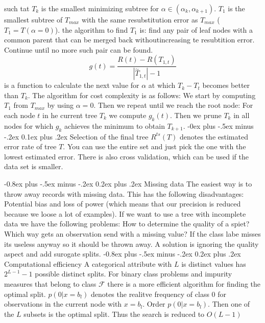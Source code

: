 \documentclass[9pt,landscape]{extarticle}
\makeatletter
\renewcommand{\subsection}{\@startsection{subsection}{2}{0mm}%
                                {-0.8ex plus -.5ex minus -.2ex}%
                                {0.2ex plus .2ex}%
                                {\normalfont\normalsize\bfseries}}
\renewcommand{\subsubsection}{\@startsection{subsubsection}{3}{0mm}%
                                {-0ex plus -.5ex minus -.2ex}%
                                {0.1ex plus .2ex}%
                                {\normalfont\small\bfseries}}
\makeatother
\begin{document}
\begin{multicols}{3}
such tat $T_k$ is the smallest minimizing subtree for
$\alpha \in (\alpha_k, \alpha_{k+1})$. $T_1$ is the smallest subtree of $T_{max}$
with the same resubstitution error as $T_{max}$ ($T_1=T(\alpha=0)$).
the algorithm to find $T_1$ is: find any pair of leaf nodes with a common parent
that can be merged back withoutincreasing te resubtition error. Continue until
no more such pair can be found.
\[g(t)=\frac{R(t)-R(T_{1,t})}{|\overset{\sim}{T}_{1,t}|-1}\]
is a function to calculate the next value for $\alpha$ at which $T_k - T_t$
becomes better than $T_k$.
The algorithm for cost complexity is as follows: We start by computing $T_1$ from $T_{max}$
by using $\alpha = 0$. Then we repeat until we reach the root node:
For each node $t$ in he current tree $T_k$ we compute $g_k(t)$. Then we prune
$T_k$ in all nodes for which $g_k$ achieves the minimum to obtain $T_{k+1}$.
\subsubsection{Selection of the final tree}
$R^{ts}(T)$ denotes the estimated error rate of tree $T$. You can use
the entire set and just pick the one with the lowest estimated error.
There is also cross validation, which can be used if the data set is smaller.

\subsection{Missing data}
The easiest way is  to throw away records with missing data.
This has the following disadvantages: Potential bias and loss of power (which
means that our precision is reduced because we loose a lot of examples).
If we want to use a tree with incomplete data we have the following problems:
How to determine the quality of a spiet? Which way gets an observation send
with a missing value?
If the class labe misses its useless anyway so it should be thrown away.
A solution is ignoring the quality aspect and add surogate splits.
\subsection{Computational efficiency}
A categorical attribute with $L$ is distinct values has $2^{L-1}-1$ possible
distinct splits.
For binary class problems and impurity measures that belong to class $\mathcal{F}$
there is a more efficient algorithm for finding the optimal split.
$p(0|x=b_l)$  denotes the realitve frequency of class 0 for observations in the
current node with $x=b_l$. Order $p(0|x=b_l)$. Then one of the $L$ subsets
is the optimal split. Thus the search is reduced to $O(L-1)$

\end{multicols}
\end{document}
